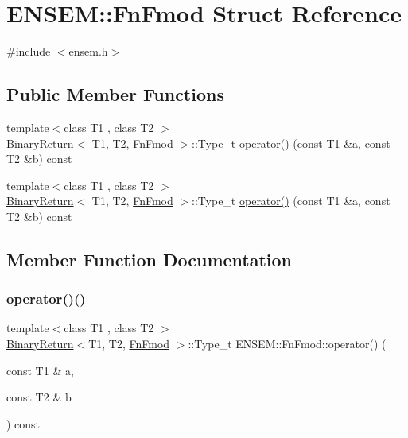 \hypertarget{structENSEM_1_1FnFmod}{}\section{E\+N\+S\+EM\+:\+:Fn\+Fmod Struct Reference}
\label{structENSEM_1_1FnFmod}


{\ttfamily \#include $<$ensem.\+h$>$}

\subsection*{Public Member Functions}
\begin{DoxyCompactItemize}
\item 
{\footnotesize template$<$class T1 , class T2 $>$ }\\\mbox{\hyperlink{structENSEM_1_1BinaryReturn}{Binary\+Return}}$<$ T1, T2, \mbox{\hyperlink{structENSEM_1_1FnFmod}{Fn\+Fmod}} $>$\+::Type\+\_\+t \mbox{\hyperlink{structENSEM_1_1FnFmod_a3c0c1761f9aede2a2ec6382073727d3f}{operator()}} (const T1 \&a, const T2 \&b) const
\item 
{\footnotesize template$<$class T1 , class T2 $>$ }\\\mbox{\hyperlink{structENSEM_1_1BinaryReturn}{Binary\+Return}}$<$ T1, T2, \mbox{\hyperlink{structENSEM_1_1FnFmod}{Fn\+Fmod}} $>$\+::Type\+\_\+t \mbox{\hyperlink{structENSEM_1_1FnFmod_a3c0c1761f9aede2a2ec6382073727d3f}{operator()}} (const T1 \&a, const T2 \&b) const
\end{DoxyCompactItemize}


\subsection{Member Function Documentation}
\mbox{\label{structENSEM_1_1FnFmod_a3c0c1761f9aede2a2ec6382073727d3f}} 
\subsubsection{\texorpdfstring{operator()()}{operator()()}\hspace{0.1cm}{\footnotesize\ttfamily [1/2]}}
{\footnotesize\ttfamily template$<$class T1 , class T2 $>$ \\
\mbox{\hyperlink{structENSEM_1_1BinaryReturn}{Binary\+Return}}$<$T1, T2, \mbox{\hyperlink{structENSEM_1_1FnFmod}{Fn\+Fmod}} $>$\+::Type\+\_\+t E\+N\+S\+E\+M\+::\+Fn\+Fmod\+::operator() (\begin{DoxyParamCaption}\item[{const T1 \&}]{a,  }\item[{const T2 \&}]{b }\end{DoxyParamCaption}) const\hspace{0.3cm}{\ttfamily [inline]}}

